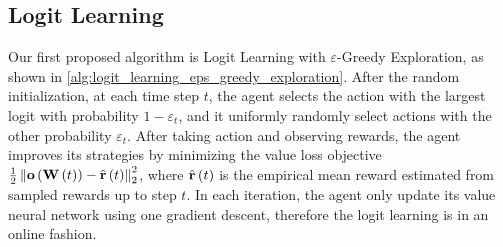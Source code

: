 \subsection{Logit Learning}
\label{subsec:logit_learning}

Our first proposed algorithm is Logit Learning with $\varepsilon$-Greedy Exploration, as shown in \cref{alg:logit_learning_eps_greedy_exploration}. After the random initialization, at each time step $t$, the agent selects the action with the largest logit with probability $1 - \varepsilon_t$, and it uniformly randomly select actions with the other probability $\varepsilon_t$. After taking action and observing rewards, the agent improves its strategies by minimizing the value loss objective $\frac{1}{2} \left\| {\mathbf{o}}\left( {\mathbf{W}}\left(t\right)\right) - \hat{{\mathbf{r}}}\left(t\right) \right\|_2^2$, where $\hat{{\mathbf{r}}}\left(t\right)$ is the empirical mean reward estimated from sampled rewards up to step $t$. In each iteration, the agent only update its value neural network using one gradient descent, therefore the logit learning is in an online fashion.


